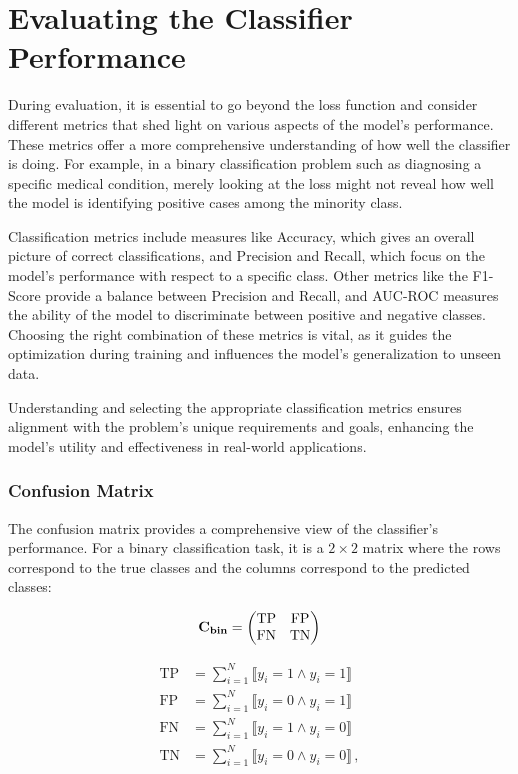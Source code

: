 \section{Evaluating the Classifier Performance}

During evaluation, it is essential to go beyond the loss function and consider different metrics that shed
light on various aspects of the model's performance. These metrics offer a more comprehensive understanding of how well
the classifier is doing. For example, in a binary classification problem such as diagnosing a specific medical
condition, merely looking at the loss might not reveal how well the model is identifying positive cases among the
minority class.

Classification metrics include measures like Accuracy, which gives an overall picture of correct classifications, and
Precision and Recall, which focus on the model's performance with respect to a specific class. Other metrics like the
F1-Score provide a balance between Precision and Recall, and AUC-ROC measures the ability of the model to discriminate
between positive and negative classes. Choosing the right combination of these metrics is vital, as it guides the
optimization during training and influences the model's generalization to unseen data.

Understanding and selecting the appropriate classification metrics ensures alignment with the problem's unique
requirements and goals, enhancing the model's utility and effectiveness in real-world applications.


\subsubsection{Confusion Matrix}
\label{sec:weihted-cm}

The confusion matrix provides a comprehensive view of the classifier's performance. For a binary classification task, it
is a $2\times2$ matrix where the rows correspond to the true classes and the columns correspond to the predicted classes:

\begin{equation}
    \mathbf{C}_{\textbf{bin}} = \begin{pmatrix}
        \text{TP} & \text{FP} \\
        \text{FN} & \text{TN} \\
    \end{pmatrix}
\end{equation}

\begin{align}
    \text{TP} & = \sum_{i=1}^{N} \llbracket y_i = 1 \land \hat{y}_i = 1 \rrbracket    \\
    \text{FP} & = \sum_{i=1}^{N} \llbracket y_i = 0 \land \hat{y}_i = 1 \rrbracket    \\
    \text{FN} & = \sum_{i=1}^{N} \llbracket y_i = 1 \land \hat{y}_i = 0 \rrbracket    \\
    \text{TN} & = \sum_{i=1}^{N} \llbracket y_i = 0 \land \hat{y}_i = 0 \rrbracket\,,
\end{align}

